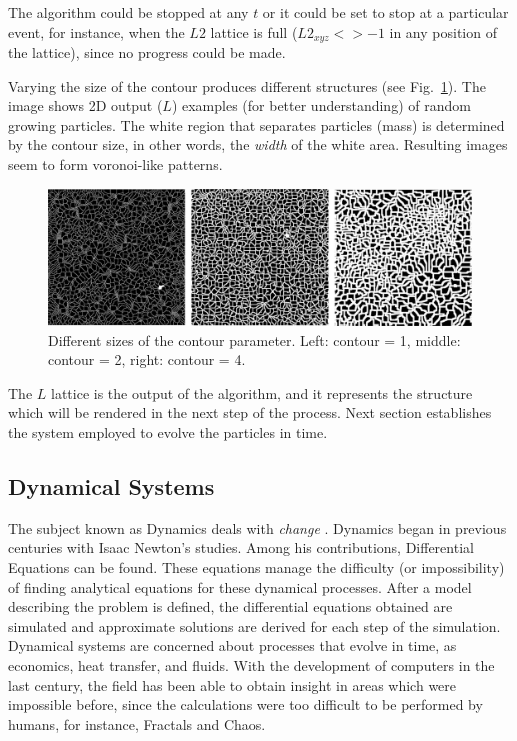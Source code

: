 \documentclass[oneside,a4paper,english,links]{amca}
\begin{document}
The algorithm could be stopped at any $t$ or it could be set to stop at a particular event, for instance, when the $L2$ lattice is full ($L2_{xyz} <> -1$ in any position of the lattice), since no progress could be made.

Varying the size of the contour produces different structures (see Fig.~\ref{fg:fig1}). The image shows 2D output ($L$) examples (for better understanding) of random growing particles. The white region that separates particles (mass) is determined by the contour size, in other words, the {\em width} of the white area. Resulting images seem to form voronoi-like patterns.


\begin{figure}[htb!]
  \centerline{\includegraphics[scale=0.22]{fig1.pdf}}
  \caption{Different sizes of the contour parameter. Left: contour = 1, middle: contour = 2, right: contour = 4.}
  \label{fg:fig1}
\end{figure}

The $L$ lattice is the output of the algorithm, and it represents the structure which will be rendered in the next step of the process. Next section establishes the system employed to evolve the particles in time.

\subsection{Dynamical Systems}

The subject known as Dynamics deals with {\em change} \citep{Strogatz2001}. Dynamics began in previous centuries with Isaac Newton's studies. Among his contributions, Differential Equations can be found. These equations manage the difficulty (or impossibility) of finding analytical equations for these dynamical processes. After a model describing the problem is defined, the differential equations obtained are simulated and approximate solutions are derived for each step of the simulation. Dynamical systems are concerned about processes that evolve in time, as economics, heat transfer, and fluids. With the development of computers in the last century, the field has been able to obtain insight in areas which were impossible before, since the calculations were too difficult to be performed by humans, for instance, Fractals \citep{Mandelbrot83} and Chaos.
\end{document}
